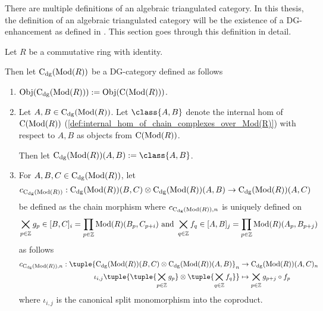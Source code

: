 There are multiple definitions of an algebraic triangulated category. In this thesis, the definition of an algebraic triangulated category will be the existence of a DG-enhancement as defined in \cite[Definition 3.1.3]{Jasso-Muro_2023}. This section goes through this definition in detail.

\begin{definition}[\( \C_{\dg}(\Mod(R)) \)]
    \label{def:c_dg_mod_r}
    Let \( R \) be a commutative ring with identity.

    Then let \emph{\( \C_{\dg}(\Mod(R)) \)} be a DG-category defined as follows
    \begin{enumerate}
        \item {
            \( \operatorname{Obj}(\operatorname{C}_{\operatorname{dg}}(\operatorname{Mod}(R))) := \operatorname{Obj}(\operatorname{C}(\operatorname{Mod}(R))) \).
        }
        \item {
            Let \( A, B \in \operatorname{C}_{\operatorname{dg}}(\operatorname{Mod}(R)) \). Let \( \class{A, B} \) denote the internal hom of \( \operatorname{C}(\operatorname{Mod}(R)) \) (\autoref{def:internal_hom_of_chain_complexes_over_Mod(R)}) with respect to \( A, B \) as objects from \( \operatorname{C}(\operatorname{Mod}(R)) \).

            Then let \( \C_{\dg}(\Mod(R))(A, B) := \class{A, B} \).
        }
        \item {
            For \( A, B, C \in \operatorname{C}_{\operatorname{dg}}(\operatorname{Mod}(R)) \), let
            \[
                c_{\operatorname{C}_{\operatorname{dg}}(\operatorname{Mod}(R))}: \operatorname{C}_{\operatorname{dg}}(\operatorname{Mod}(R))(B, C) \otimes \operatorname{C}_{\operatorname{dg}}(\operatorname{Mod}(R))(A, B) \to \operatorname{C}_{\operatorname{dg}}(\operatorname{Mod}(R))(A, C)
            \]
            be defined as the chain morphism where \( c_{\operatorname{C}_{\operatorname{dg}}(\operatorname{Mod}(R)), n} \) is uniquely defined on
            \[
                \bigtimes_{p \in {\mathbb{Z}}} g_p \in [B, C]_i = \prod_{p \in {\mathbb{Z}}} \operatorname{Mod}(R)(B_p, C_{p + i}) \text{ and } \bigtimes_{q \in {\mathbb{Z}}} f_q \in [A, B]_j = \prod_{p \in {\mathbb{Z}}} \operatorname{Mod}(R)(A_p, B_{p + j})
            \]
            as follows
            \begin{align*}
                c_{\C_{\dg}(\Mod(R)), n}: \tuple{ \C_{\dg}(\Mod(R))(B, C) \otimes \C_{\dg}(\Mod(R))(A, B) }_n &\to \C_{\dg}(\Mod(R))(A, C)_n \\
                \iota_{i, j} \tuple{\tuple{ \bigtimes_{p \in \Zb} g_p } \otimes \tuple{ \bigtimes_{q \in \Zb} f_q } } &\mapsto \bigtimes_{p \in \Zb} g_{p + j} \circ f_p
            \end{align*}
            where \( \iota_{i, j} \) is the canonical split monomorphism into the coproduct.
        }
    \end{enumerate}
\end{definition}

